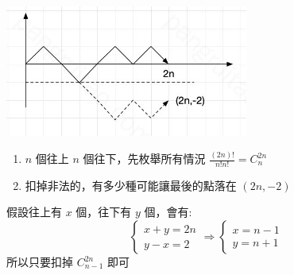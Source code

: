 \includegraphics[width=8cm]{6_Math/Catalan.png}
\begin{enumerate}
\item $n$ 個往上 $n$ 個往下，先枚舉所有情況 $\frac{(2n)!}{n!n!} = C_{n}^{2n}$
\item 扣掉非法的，有多少種可能讓最後的點落在 $(2n, -2)$
\end{enumerate}
假設往上有 $x$ 個，往下有 $y$ 個，會有:
$$
\begin{cases}
x + y = 2n\\
y - x = 2
\end{cases}
\Rightarrow
\begin{cases}
x = n - 1\\
y = n + 1
\end{cases}
$$
所以只要扣掉 $C_{n-1}^{2n}$ 即可